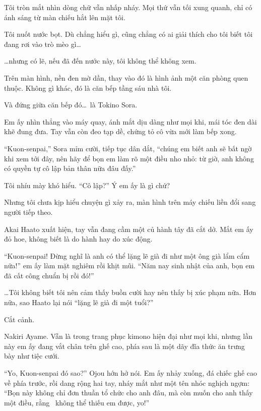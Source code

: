 \documentclass[../main.tex]{subfiles}
\begin{document}
Tôi tròn mắt nhìn dòng chữ vẫn nhấp nháy. Mọi thứ vẫn tối xung quanh, chỉ có ánh sáng từ màn chiếu hắt lên mặt tôi.

Tôi nuốt nước bọt. Dù chẳng hiểu gì, cũng chẳng có ai giải thích cho tôi biết tôi đang rơi vào trò mèo gì\dots

\dots nhưng có lẽ, nếu đã đến nước này, tôi không thể không xem.

\il

Trên màn hình, nền đen mờ dần, thay vào đó là hình ảnh một căn phòng quen thuộc. Không gì khác, đó là căn bếp tầng sáu nhà tôi.

Và đứng giữa căn bếp đó\dots\ là Tokino Sora.

Em ấy nhìn thẳng vào máy quay, ánh mắt dịu dàng như mọi khi, mái tóc đen dài khẽ đung đưa. Tay vẫn còn đeo tạp dề, chứng tỏ cô vừa mới làm bếp xong.

``Kuon-senpai,'' Sora mỉm cười, tiếp tục dân dắt, ``chúng em biết anh sẽ bất ngờ khi xem tới đây, nên hãy để bọn em  làm rõ một điều nho nhỏ: từ giờ, anh không có quyền tự cô lập bản thân nữa đâu đấy.''

Tôi nhíu mày khó hiểu. ``Cô lập?'' Ý em ấy là gì chứ?

Nhưng tôi chưa kịp hiểu chuyện gì xảy ra, màn hình trên máy chiếu liền đổi sang người tiếp theo.

\ct

Akai Haato xuất hiện, tay vẫn đang cầm một củ hành tây đã cắt dở. Mắt em ấy đỏ hoe, không biết là do hành hay do xúc động.

``Kuon-senpai! Đừng nghĩ là anh có thể lặng lẽ già đi như một ông già lẩm cẩm nữa!'' em ấy làm mặt nghiêm rồi khịt mũi. ``Năm nay sinh nhật của anh, bọn em đã cất công chuẩn bị rồi đó!''

\dots Tôi không biết tôi nên cảm thấy buồn cười hay nên thấy bị xúc phạm nữa. Hơn nữa, sao Haato lại nói ``lặng lẽ già đi một tuổi?''

Cắt cảnh.

\ct

Nakiri Ayame. Vẫn là trong trang phục kimono hiện đại như mọi khi, nhưng lần này em ấy đang vắt chân trên ghế cao, phía sau là một dãy đĩa thức ăn trưng bày như tiệc cưới.

``Yo, Kuon-senpai đó sao?'' Ojou hớn hở nói. Em ấy nhảy xuống, đá chiếc ghế cao về phía trước, rồi dang rộng hai tay, nháy mắt như một tên nhóc nghịch ngợm: ``Bọn này không chỉ đơn thuần tổ chức cho anh đâu, mà còn muốn cho anh thấy một điều, rằng \hll\ không thể thiếu em được, yo!''
\end{document}
